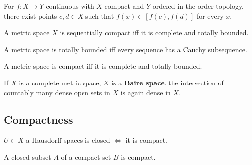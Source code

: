 \begin{theorem}

For \(f:X \to Y\) continuous with \(X\) compact and \(Y\) ordered in the
order topology, there exist points \(c, d\in X\) such that
\(f(x) \in [f(c), f(d)]\) for every \(x\).

\end{theorem}

\begin{theorem}

A metric space \(X\) is sequentially compact iff it is complete and
totally bounded.

\end{theorem}

\begin{theorem}

A metric space is totally bounded iff every sequence has a Cauchy
subsequence.

\end{theorem}

\begin{theorem}

A metric space is compact iff it is complete and totally bounded.

\end{theorem}

\begin{theorem}[Baire]

If \(X\) is a complete metric space, \(X\) is a \textbf{Baire space}:
the intersection of countably many dense open sets in \(X\) is again
dense in \(X\).

\end{theorem}

\hypertarget{compactness}{%
\subsection{Compactness}\label{compactness}}

\begin{theorem}

\(U\subset X\) a Hausdorff spaces is closed \(\iff\) it is compact.

\end{theorem}

\begin{theorem}

A closed subset \(A\) of a compact set \(B\) is compact.

\end{theorem}

